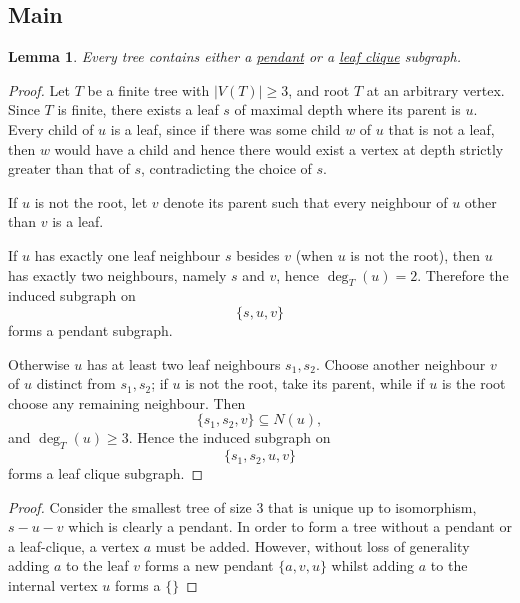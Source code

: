 \documentclass[11pt]{article}
\newtheorem{lemma}{Lemma}
\begin{document}
\subsection{Main}


\begin{lemma} \label{lemma::tree_pendant_leaf_clique}
  Every tree contains either a \hyperref[def::pendant]{pendant} or a \hyperref[def::leaf_clique]{leaf clique} subgraph.
\end{lemma}
\begin{proof} 
  Let $T$ be a finite tree with $|V(T)|\ge 3$, and root $T$ at an arbitrary vertex. Since $T$ is finite, there exists a leaf $s$ of maximal depth where its parent is $u$. Every child of $u$ is a leaf, since if there was some child $w$ of $u$ that is not a leaf, then $w$ would have a child and hence there would exist a vertex at depth strictly greater than that of $s$, contradicting the choice of $s$.

  If $u$ is not the root, let $v$ denote its parent such that every neighbour of $u$ other than $v$ is a leaf.

  If $u$ has exactly one leaf neighbour $s$ besides $v$ (when $u$ is not the root), then $u$ has exactly two neighbours, namely $s$ and $v$, hence $\deg_T(u)=2$. Therefore the induced subgraph on
  \[
  \{s,u,v\}
  \]
  forms a pendant subgraph.

  Otherwise $u$ has at least two leaf neighbours $s_1,s_2$. Choose another neighbour $v$ of $u$ distinct from $s_1,s_2$; if $u$ is not the root, take its parent, while if $u$ is the root choose any remaining neighbour. Then
  \[
  \{s_1,s_2,v\}\subseteq N(u),
  \]
  and $\deg_T(u)\ge3$. Hence the induced subgraph on
  \[
  \{s_1,s_2,u,v\}
  \]
  forms a leaf clique subgraph.
\end{proof}
\begin{proof}
  Consider the smallest tree of size $3$ that is unique up to isomorphism, $s-u-v$ which is clearly a pendant. In order to form a tree without a pendant or a leaf-clique, a vertex $a$ must be added. However, without loss of generality adding $a$ to the leaf $v$ forms a new pendant $\{a,v,u\}$ whilst adding $a$ to the internal vertex $u$ forms a $\{\}$ 
\end{proof}
\end{document}
